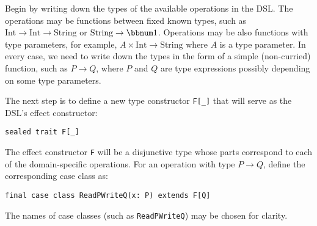 Begin by writing down the types of the available operations in the
DSL. The operations may be functions between fixed known types, such
as $\text{Int}\rightarrow\text{Int}\rightarrow\text{String}$ or $\text{String}\rightarrow\bbnum 1$.
Operations may be also functions with type parameters, for example,
$A\times\text{Int}\rightarrow\text{String}$ where $A$ is a type
parameter. In every case, we need to write down the types in the form
of a simple (non-curried) function, such as $P\rightarrow Q$, where
$P$ and $Q$ are type expressions possibly depending on some type
parameters.

The next step is to define a new type constructor \lstinline!F[_]!
that will serve as the DSL\textsf{'}s effect constructor:
\begin{lstlisting}
sealed trait F[_]
\end{lstlisting}
 The effect constructor \lstinline!F!
will be a disjunctive type whose parts correspond to each of the domain-specific
operations. For an operation with type $P\rightarrow Q$, define the
corresponding case class as:
\begin{lstlisting}
final case class ReadPWriteQ(x: P) extends F[Q]
\end{lstlisting}
The names of case classes (such as \lstinline!ReadPWriteQ!)
may be chosen for clarity.

